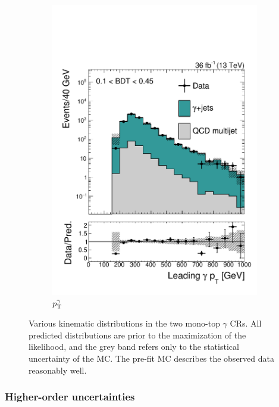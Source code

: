 \begin{figure}[]
\begin{center}
\begin{subfigure}[t]{0.32\textwidth}
            \includegraphics[width=\textwidth]{figures/monotop/prefit/photon_loose_loosePho1Pt_logy.pdf}
            \caption{$p_\mathrm{T}^\gamma$}
        \end{subfigure}
        \caption{Various kinematic distributions in the two mono-top $\gamma$ CRs. 
                 All predicted distributions are prior to the maximization of the likelihood, and the grey band refers only to the statistical uncertainty of the MC.
                 The pre-fit MC describes the observed data reasonably well.
        }
        \label{fig:mt:prefit_photon}
    \end{center}
\end{figure}

\subsubsection{Higher-order uncertainties}

